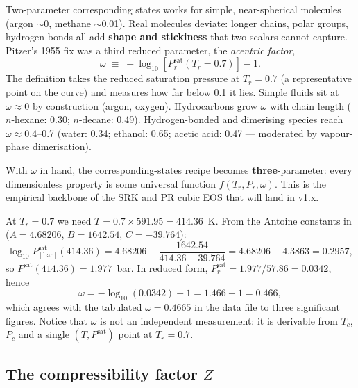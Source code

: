 \documentclass[11pt,a4paper]{article}
\begin{document}
Two-parameter corresponding states works for simple, near-spherical
molecules (argon $\sim$0, methane $\sim$0.01).  Real molecules
deviate: longer chains, polar groups, hydrogen bonds all add
\textbf{shape and stickiness} that two scalars cannot capture.
Pitzer's 1955 fix was a third reduced parameter, the
\emph{acentric factor},
\begin{equation}
   \boxed{\;
   \omega \;\equiv\; -\log_{10}\!\left[ P^{\mathrm{sat}}_r(T_r = 0.7) \right] - 1.
   \;}
   \label{eq:criticals-omega}
\end{equation}
The definition takes the reduced saturation pressure at $T_r = 0.7$
(a representative point on the curve) and measures how far below 0.1
it lies.  Simple fluids sit at $\omega \approx 0$ by construction
(argon, oxygen).  Hydrocarbons grow $\omega$ with chain length
($n$-hexane: 0.30; $n$-decane: 0.49).  Hydrogen-bonded and dimerising
species reach $\omega \approx 0.4$--0.7 (water: 0.34; ethanol: 0.65;
acetic acid: 0.47 --- moderated by vapour-phase dimerisation).

With $\omega$ in hand, the corresponding-states recipe becomes
\textbf{three}-parameter: every dimensionless property is some
universal function $f(T_r, P_r, \omega)$.  This is the empirical
backbone of the SRK and PR cubic EOS that will land in v1.x.

\begin{example}
At $T_r = 0.7$ we need $T = 0.7 \times 591.95 = 414.36$~K.  From
the Antoine constants in
 ($A=4.68206$, $B=1642.54$, $C=-39.764$):
\[
   \log_{10} P^{\mathrm{sat}}_{\mathrm{[bar]}}(414.36)
   = 4.68206 - \frac{1642.54}{414.36 - 39.764}
   = 4.68206 - 4.3863
   = 0.2957,
\]
so $P^{\mathrm{sat}}(414.36) = 1.977$~bar.  In reduced form,
$P^{\mathrm{sat}}_r = 1.977 / 57.86 = 0.0342$, hence
\[
   \omega = -\log_{10}(0.0342) - 1 = 1.466 - 1 = 0.466,
\]
which agrees with the tabulated $\omega = 0.4665$ in the data file
to three significant figures.  Notice that $\omega$ is not an
independent measurement: it is derivable from $T_c$, $P_c$ and a
single $(T, P^{\mathrm{sat}})$ point at $T_r = 0.7$.
\end{example}

\subsection{The compressibility factor $Z$}
\end{document}
